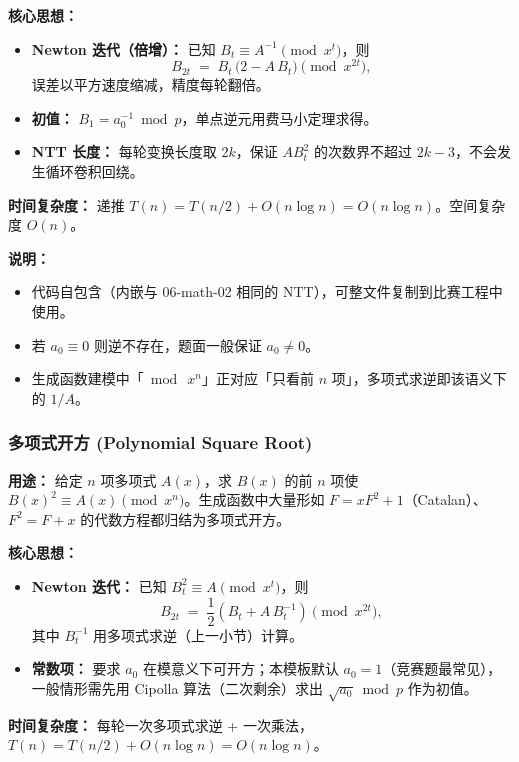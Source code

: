 \textbf{核心思想：}
\begin{itemize}
    \item \textbf{Newton 迭代（倍增）：} 已知 $B_t \equiv A^{-1} \pmod{x^t}$，则
    \[ B_{2t} \;=\; B_t\,\bigl(2 - A\,B_t\bigr) \pmod{x^{2t}}, \]
    误差以平方速度缩减，精度每轮翻倍。
    \item \textbf{初值：} $B_1 = a_0^{-1} \bmod p$，单点逆元用费马小定理求得。
    \item \textbf{NTT 长度：} 每轮变换长度取 $2k$，保证 $A B_t^2$ 的次数界不超过 $2k-3$，不会发生循环卷积回绕。
\end{itemize}

\textbf{时间复杂度：} 递推 $T(n)=T(n/2)+O(n\log n)=O(n\log n)$。空间复杂度 $O(n)$。



\textbf{说明：}
\begin{itemize}
    \item 代码自包含（内嵌与 06-math-02 相同的 NTT），可整文件复制到比赛工程中使用。
    \item 若 $a_0 \equiv 0$ 则逆不存在，题面一般保证 $a_0 \ne 0$。
    \item 生成函数建模中「$\bmod\ x^n$」正对应「只看前 $n$ 项」，多项式求逆即该语义下的 $1/A$。
\end{itemize}

\subsubsection{多项式开方 (Polynomial Square Root)}

\textbf{用途：}  
给定 $n$ 项多项式 $A(x)$，求 $B(x)$ 的前 $n$ 项使 $B(x)^2 \equiv A(x) \pmod{x^n}$。生成函数中大量形如 $F=xF^2+1$（Catalan）、$F^2=F+x$ 的代数方程都归结为多项式开方。

\textbf{核心思想：}
\begin{itemize}
    \item \textbf{Newton 迭代：} 已知 $B_t^2 \equiv A \pmod{x^t}$，则
    \[ B_{2t} \;=\; \frac{1}{2}\left(B_t + A\,B_t^{-1}\right) \pmod{x^{2t}}, \]
    其中 $B_t^{-1}$ 用多项式求逆（上一小节）计算。
    \item \textbf{常数项：} 要求 $a_0$ 在模意义下可开方；本模板默认 $a_0=1$（竞赛题最常见），一般情形需先用 Cipolla 算法（二次剩余）求出 $\sqrt{a_0} \bmod p$ 作为初值。
\end{itemize}

\textbf{时间复杂度：} 每轮一次多项式求逆 + 一次乘法，$T(n)=T(n/2)+O(n\log n)=O(n\log n)$。

